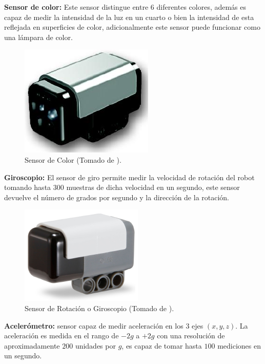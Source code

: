 \documentclass[twocolumn]{IEEEtran}
\begin{document}
\begin{enumerate}
\textbf{Sensor de color:} Este sensor distingue entre 6 diferentes colores, además es capaz de medir la intensidad de la luz  en un cuarto o bien la intensidad de esta reflejada en superficies de color, adicionalmente este sensor puede funcionar como una lámpara de color.
\begin{figure}[H]
	\centering
		\includegraphics[scale=0.6]{color.png}
	\caption{Sensor de Color (Tomado de \cite{page2}).}
	\label{fig2}
\end{figure}
\noindent
\textbf{Giroscopio:} El sensor de giro permite medir la velocidad de rotación del robot tomando hasta $300$ muestras de dicha velocidad en un segundo, este sensor devuelve  el número de grados por segundo y la dirección de la rotación.
\begin{figure}[H]
	\centering
		\includegraphics[scale=0.6]{rotacion.png}
	\caption{Sensor de Rotación o Giroscopio (Tomado de \cite{page2}).}
	\label{fig3}
\end{figure}

\textbf{Acelerómetro:} sensor capaz de medir aceleración en los $3$ ejes $(x, y, z)$.  La aceleración es medida en el rango de $-2g$ a $+2g$ con una resolución de aproximadamente $200$ unidades por $g$, es capaz de tomar hasta $100$ mediciones en un segundo.\\


\end{enumerate}
\end{document}
